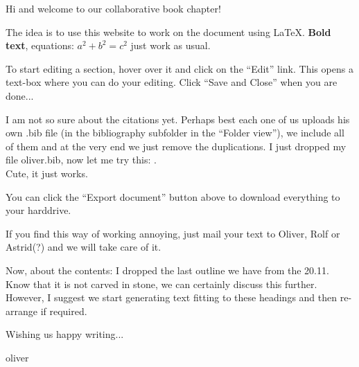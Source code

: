 Hi and welcome to our collaborative book chapter!  

The idea is to use this website to work on the document using \LaTeX.  \textbf{Bold text}, equations: $a^2+b^2=c^2$ just work as usual.  

To start editing a section, hover over it and click on the ``Edit'' link.  This opens a text-box where you can do your editing.  Click ``Save and Close'' when you are done...

I am not so sure about the citations yet.  Perhaps best each one of us uploads his own .bib file (in the bibliography subfolder in the ``Folder view''), we include all of them and at the very end we just remove the duplications.  
I just dropped my file oliver.bib, now let me try this: \cite{buehler2012}.\\
Cute, it just works.  

You can click the ``Export document'' button above to download everything to your harddrive.  

If you find this way of working annoying, just mail your text to Oliver, Rolf or Astrid(?) and we will take care of it.  

Now, about the contents:  
I dropped the last outline we have from the 20.11.  Know that it is not carved in stone, we can certainly discuss this further.  However, I suggest we start generating text fitting to these headings and then re-arrange if required.  

Wishing us happy writing... 

oliver